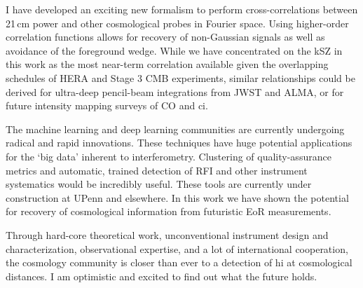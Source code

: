 {I have developed an exciting new formalism to perform cross-correlations between 21\,cm power and other cosmological probes in Fourier space. Using higher-order correlation functions allows for recovery of non-Gaussian signals as well as avoidance of the foreground wedge. While we have concentrated on the kSZ in this work as the most near-term correlation available given the overlapping schedules of HERA and Stage 3 CMB experiments, similar relationships could be derived for ultra-deep pencil-beam integrations from JWST and ALMA, or for future intensity mapping surveys of CO and {\sc ci}.

The machine learning and deep learning communities are currently undergoing radical and rapid innovations. These techniques have huge potential applications for the `big data' inherent to interferometry. Clustering of quality-assurance metrics and automatic, trained detection of RFI and other instrument systematics would be incredibly useful. These tools are currently under construction at UPenn and elsewhere. In this work we have shown the potential for recovery of cosmological information from futuristic EoR measurements.

Through hard-core theoretical work, unconventional instrument design and characterization, observational expertise, and a lot of international cooperation, the cosmology community is closer than ever to a detection of {\sc hi} at cosmological distances. I am optimistic and excited to find out what the future holds.
}